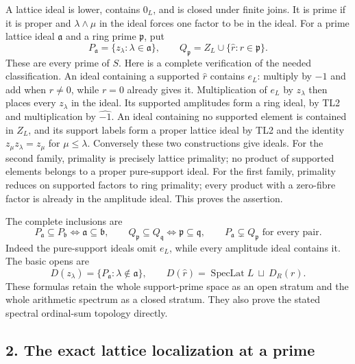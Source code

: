 A lattice ideal is lower, contains \(0_L\), and is closed under finite
joins. It is prime if it is proper and \(\lambda\wedge\mu\) in the ideal
forces one factor to be in the ideal. For a prime lattice ideal
\(\mathfrak a\) and a ring prime \(\mathfrak p\), put \[
 P_{\mathfrak a}=\{z_\lambda:\lambda\in\mathfrak a\},\qquad
 Q_{\mathfrak p}=Z_L\cup\{\widehat r:r\in\mathfrak p\}.
 \tag{TL3}
\] These are every prime of \(S\). Here is a complete verification of
the needed classification. An ideal containing a supported
\(\widehat r\) contains \(e_L\): multiply by \(-1\) and add when
\(r\ne0\), while \(r=0\) already gives it. Multiplication of \(e_L\) by
\(z_\lambda\) then places every \(z_\lambda\) in the ideal. Its
supported amplitudes form a ring ideal, by TL2 and multiplication by
\(\widehat{-1}\). An ideal containing no supported element is contained
in \(Z_L\), and its support labels form a proper lattice ideal by TL2
and the identity \(z_\mu z_\lambda=z_\mu\) for \(\mu\le\lambda\).
Conversely these two constructions give ideals. For the second family,
primality is precisely lattice primality; no product of supported
elements belongs to a proper pure-support ideal. For the first family,
primality reduces on supported factors to ring primality; every product
with a zero-fibre factor is already in the amplitude ideal. This proves
the assertion.

The complete inclusions are \[
 P_{\mathfrak a}\subseteq P_{\mathfrak b}\iff\mathfrak a\subseteq\mathfrak b,
 \qquad Q_{\mathfrak p}\subseteq Q_{\mathfrak q}\iff\mathfrak p\subseteq\mathfrak q,
 \qquad P_{\mathfrak a}\subsetneq Q_{\mathfrak p}\text{ for every pair}.
 \tag{TL4}
\] Indeed the pure-support ideals omit \(e_L\), while every amplitude
ideal contains it. The basic opens are \[
 D(z_\lambda)=\{P_{\mathfrak a}:\lambda\notin\mathfrak a\},\qquad
 D(\widehat r)=\operatorname{SpecLat}L\ \sqcup\ D_R(r).
 \tag{TL5}
\] These formulas retain the whole support-prime space as an open
stratum and the whole arithmetic spectrum as a closed stratum. They also
prove the stated spectral ordinal-sum topology directly.

\subsection{2. The exact lattice localization at a
prime}\label{the-exact-lattice-localization-at-a-prime}

